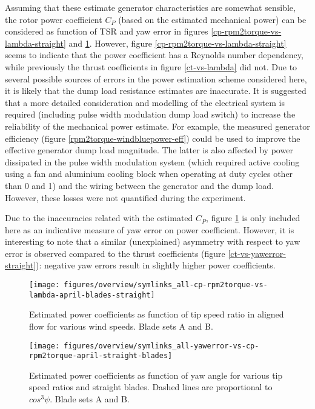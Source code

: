 \documentclass[a4paper]{jpconf}
\begin{document}
Assuming that these estimate generator characteristics are somewhat sensible, the rotor power coefficient $C_P$ (based on the estimated mechanical power) can be considered as function of TSR and yaw error in figures \ref{cp-rpm2torque-vs-lambda-straight} and \ref{cp-rpm2torque-vs-yawerror-straight}. However, figure \ref{cp-rpm2torque-vs-lambda-straight} seems to indicate that the power coefficient has a Reynolds number dependency, while previously the thrust coefficients in figure \ref{ct-vs-lambda} did not. Due to several possible sources of errors in the power estimation scheme considered here, it is likely that the dump load resistance estimates are inaccurate. It is suggested that a more detailed consideration and modelling of the electrical system is required (including pulse width modulation dump load switch) to increase the reliability of the mechanical power estimate. For example, the measured generator efficiency (figure \ref{rpm2torque-windbluepower-eff}) could be used to improve the effective generator dump load magnitude. The latter is also affected by power dissipated in the pulse width modulation system (which required active cooling using a fan and aluminium cooling block when operating at duty cycles other than 0 and 1) and the wiring between the generator and the dump load. However, these losses were not quantified during the experiment.

Due to the inaccuracies related with the estimated $C_P$, figure \ref{cp-rpm2torque-vs-yawerror-straight} is only included here as an indicative measure of yaw error on power coefficient. However, it is interesting to note that a similar (unexplained) asymmetry with respect to yaw error is observed compared to the thrust coefficients (figure \ref{ct-vs-yawerror-straight}): negative yaw errors result in slightly higher power coefficients.


\begin{figure}[h]
\begin{minipage}{17pc}
\texttt{[image: figures/overview/symlinks\_all-cp-rpm2torque-vs-lambda-april-blades-straight]}
\caption{\label{cp-rpm2torque-vs-lambda-straight} Estimated power coefficients as function of tip speed ratio in aligned flow for various wind speeds. Blade sets A and B.}
\vspace{10px}
\end{minipage}\hspace{3pc}%
\begin{minipage}{17pc}
\texttt{[image: figures/overview/symlinks\_all-yawerror-vs-cp-rpm2torque-april-straight-blades]}
\caption{\label{cp-rpm2torque-vs-yawerror-straight} Estimated power coefficients as function of yaw angle for various tip speed ratios and straight blades. Dashed lines are proportional to $cos^3 \psi$. Blade sets A and B.}
\end{minipage} 
\end{figure}
\end{document}
